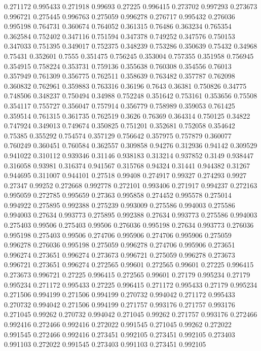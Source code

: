 0.271172 0.995433
0.271918 0.99693
0.27225 0.996415
0.273702 0.997293
0.273673 0.996721
0.275445 0.996763
0.275059 0.996278
0.276717 0.995432
0.276036 0.995198
0.764731 0.360674
0.764052 0.361315
0.76486 0.363234
0.765354 0.362584
0.752402 0.347116
0.751594 0.347378
0.749252 0.347576
0.750153 0.347033
0.751395 0.349017
0.752375 0.348239
0.753286 0.350639
0.75432 0.34968
0.75431 0.352601
0.7555 0.351475
0.756245 0.353004
0.757355 0.351958
0.756945 0.354915
0.758224 0.353731
0.759136 0.355638
0.760308 0.354556
0.76013 0.357949
0.761309 0.356775
0.762511 0.358639
0.763482 0.357787
0.762098 0.360832
0.762961 0.359883
0.763316 0.36196
0.7643 0.36381
0.750826 0.34775
0.748506 0.348237
0.750494 0.34988
0.752248 0.351642
0.753161 0.353656
0.75508 0.354117
0.755727 0.356047
0.757914 0.356779
0.758989 0.359053
0.761425 0.359514
0.761315 0.361735
0.762519 0.3626
0.76369 0.364314
0.750125 0.34822
0.747924 0.349013
0.749674 0.350825
0.751201 0.352681
0.752058 0.354642
0.75385 0.355292
0.754574 0.357129
0.756642 0.357975
0.757879 0.360077
0.760249 0.360451
0.760584 0.362557
0.309858 0.94276
0.312936 0.94142
0.309529 0.941022
0.310112 0.939346
0.31146 0.938183
0.313214 0.937852
0.3149 0.938447
0.316058 0.93981
0.316374 0.941567
0.315768 0.94324
0.31441 0.944382
0.31267 0.944695
0.311007 0.944101
0.27518 0.99408
0.274917 0.99327
0.274293 0.9927
0.27347 0.99252
0.272668 0.992778
0.272101 0.993406
0.271917 0.994237
0.272163 0.995059
0.272785 0.995659
0.27363 0.995858
0.274452 0.995578
0.275014 0.994922
0.275895 0.992388
0.275239 0.993009
0.275586 0.994003
0.275586 0.994003
0.27634 0.993773
0.275895 0.992388
0.27634 0.993773
0.275586 0.994003
0.275403 0.99506
0.275403 0.99506
0.276036 0.995198
0.27634 0.993773
0.276036 0.995198
0.275403 0.99506
0.274706 0.995906
0.274706 0.995906
0.275059 0.996278
0.276036 0.995198
0.275059 0.996278
0.274706 0.995906
0.273651 0.996274
0.273651 0.996274
0.273673 0.996721
0.275059 0.996278
0.273673 0.996721
0.273651 0.996274
0.272565 0.99601
0.272565 0.99601
0.27225 0.996415
0.273673 0.996721
0.27225 0.996415
0.272565 0.99601
0.27179 0.995234
0.27179 0.995234
0.271172 0.995433
0.27225 0.996415
0.271172 0.995433
0.27179 0.995234
0.271506 0.994199
0.271506 0.994199
0.270732 0.994042
0.271172 0.995433
0.270732 0.994042
0.271506 0.994199
0.271757 0.993176
0.271757 0.993176
0.271045 0.99262
0.270732 0.994042
0.271045 0.99262
0.271757 0.993176
0.272466 0.992416
0.272466 0.992416
0.272022 0.991545
0.271045 0.99262
0.272022 0.991545
0.272466 0.992416
0.273451 0.992105
0.273451 0.992105
0.273403 0.991103
0.272022 0.991545
0.273403 0.991103
0.273451 0.992105
